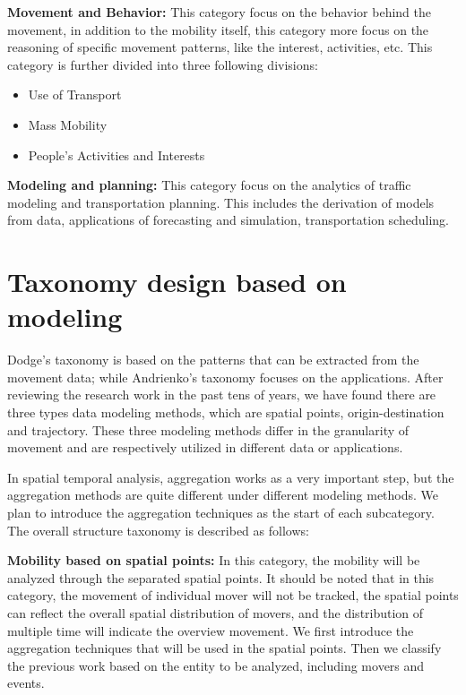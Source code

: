 \textbf{Movement and Behavior:} This category focus on the behavior behind the movement, in addition to the mobility itself, this category more focus on the reasoning of specific movement patterns, like the interest, activities, etc. This category is further divided into three following divisions: 

\begin{itemize}
	\item Use of Transport
	\item Mass Mobility
	\item People’s Activities and Interests
\end{itemize}

\textbf{Modeling and planning:} This category focus on the analytics of traffic modeling and transportation planning. This includes the derivation of models from data, applications of forecasting and simulation, transportation scheduling.

\section{Taxonomy design based on modeling}
Dodge's taxonomy is based on the patterns that can be extracted from the movement data; while Andrienko's taxonomy focuses on the applications. After reviewing the research work in the past tens of years, we have found there are three types data modeling methods, which are spatial points, origin-destination and trajectory. These three modeling methods differ in the granularity of movement and are respectively utilized in different data or applications. 


In spatial temporal analysis, aggregation works as a very important step, but the aggregation methods are quite different under different modeling methods. We plan to introduce the aggregation techniques as the start of each subcategory. The overall structure taxonomy is described as follows:

\textbf{Mobility based on spatial points:} In this category, the mobility will be analyzed through the separated spatial points. It should be noted that in this category, the movement of individual mover will not be tracked, the spatial points can reflect the overall spatial distribution of movers, and the distribution of multiple time will indicate the overview movement. We first introduce the aggregation techniques that will be used in the spatial points. Then we classify the previous work based on the entity to be analyzed, including movers and events.

